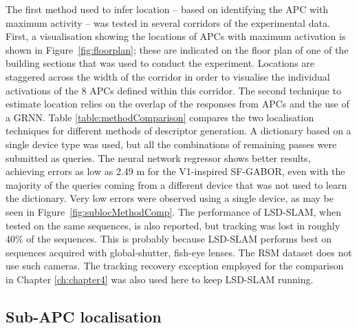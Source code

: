 The first method used to infer location -- based on identifying the APC with maximum activity -- was tested in several corridors of the experimental data.  First, a visualisation showing the locations of APCs with maximum activation is shown in Figure~\ref{fig:floorplan}; these are indicated on the floor plan of one of the building sections that was used to conduct the experiment.  Locations are staggered across the width of the corridor in order to visualise the individual activations of the 8 APCs defined within this corridor. The second technique to estimate location relies on the overlap of the responses from APCs and the use of a GRNN. Table \ref{table:methodComparison} compares the two localisation techniques for different methods of descriptor generation. A dictionary based on a single device type was used, but all the combinations of remaining passes were submitted as queries. The neural network regressor shows better results, achieving errors as low as 2.49 m for the V1-inspired SF-GABOR, even with the majority of the queries coming from a different device that was not used to learn the dictionary. Very low errors were observed using a single device, as may be seen in Figure~\ref{fig:sublocMethodComp}. The performance of LSD-SLAM, when tested on the same sequences, is also reported, but tracking was lost in roughly 40\% of the sequences. This is probably because LSD-SLAM performs best on sequences acquired with global-shutter, fish-eye lenses. The RSM dataset does not use such cameras. The tracking recovery exception employed for the comparison in Chapter \ref{ch:chapter4} was also used here to keep LSD-SLAM running. 







\subsection{Sub-APC localisation}


